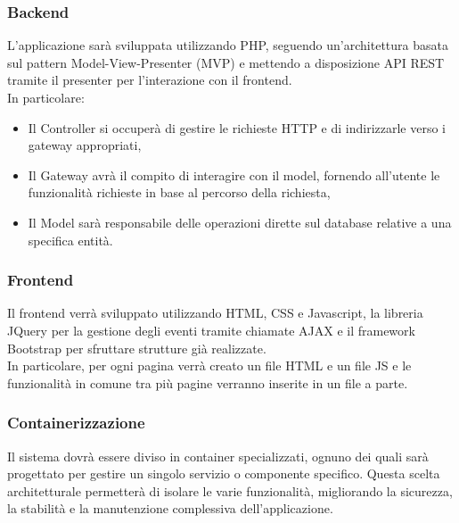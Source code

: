 \documentclass{article}
\begin{document}
\subsubsection{Backend}
L'applicazione sarà sviluppata utilizzando PHP, seguendo un'architettura basata sul pattern Model-View-Presenter (MVP) e mettendo a disposizione API REST tramite il presenter per l'interazione con il frontend.\\ In particolare:
\begin{itemize}
    \item Il Controller si occuperà di gestire le richieste HTTP e di indirizzarle verso i gateway appropriati,
    \item Il Gateway avrà il compito di interagire con il model, fornendo all’utente le funzionalità richieste in base al percorso della richiesta,
    \item Il Model sarà responsabile delle operazioni dirette sul database relative a una specifica entità.
\end{itemize}

\subsubsection{Frontend}
Il frontend verrà sviluppato utilizzando HTML, CSS e Javascript, la libreria JQuery per la gestione degli eventi tramite chiamate AJAX e il framework Bootstrap per sfruttare strutture già realizzate.\\
In particolare, per ogni pagina verrà creato un file HTML e un file JS e le funzionalità in comune tra più pagine verranno inserite in un file a parte.

\subsubsection{Containerizzazione}
Il sistema dovrà essere diviso in container specializzati, ognuno dei quali sarà progettato per gestire un singolo servizio o componente specifico. Questa scelta architetturale permetterà di isolare le varie funzionalità, migliorando la sicurezza, la stabilità e la manutenzione complessiva dell'applicazione.\\
\end{document}
